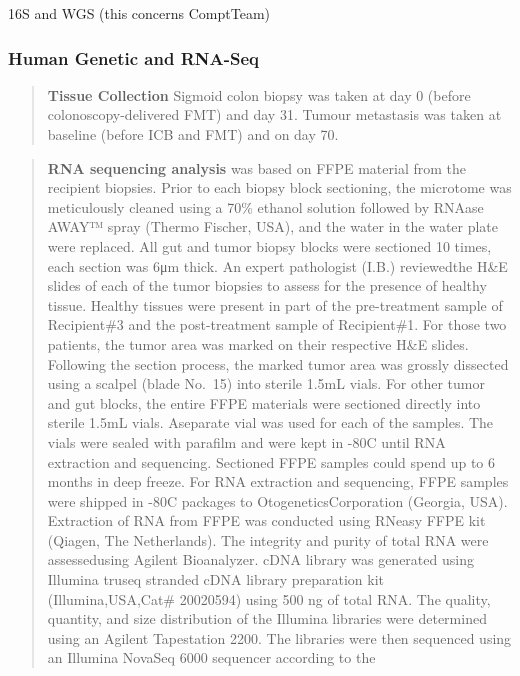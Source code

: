 \documentclass[
]{article}
\begin{document}
16S and WGS (this concerns ComptTeam)

\hypertarget{human-genetic-and-rna-seq}{%
\subsubsection{Human Genetic and
RNA-Seq}\label{human-genetic-and-rna-seq}}

\begin{quote}
\textbf{Tissue Collection} Sigmoid colon biopsy was taken at day 0
(before colonoscopy-delivered FMT) and day 31. Tumour metastasis was
taken at baseline (before ICB and FMT) and on day 70.
\end{quote}

\begin{quote}
\textbf{RNA sequencing analysis} was based on FFPE material from the
recipient biopsies. Prior to each biopsy block sectioning, the microtome
was meticulously cleaned using a 70\% ethanol solution followed by
RNAase AWAY™ spray (Thermo Fischer, USA), and the water in the water
plate were replaced. All gut and tumor biopsy blocks were sectioned 10
times, each section was 6μm thick. An expert pathologist (I.B.)
reviewedthe H\&E slides of each of the tumor biopsies to assess for the
presence of healthy tissue. Healthy tissues were present in part of the
pre-treatment sample of Recipient\#3 and the post-treatment sample of
Recipient\#1. For those two patients, the tumor area was marked on their
respective H\&E slides. Following the section process, the marked tumor
area was grossly dissected using a scalpel (blade No.~15) into sterile
1.5mL vials. For other tumor and gut blocks, the entire FFPE materials
were sectioned directly into sterile 1.5mL vials. Aseparate vial was
used for each of the samples. The vials were sealed with parafilm and
were kept in -80C until RNA extraction and sequencing. Sectioned FFPE
samples could spend up to 6 months in deep freeze. For RNA extraction
and sequencing, FFPE samples were shipped in -80C packages to
OtogeneticsCorporation (Georgia, USA). Extraction of RNA from FFPE was
conducted using RNeasy FFPE kit (Qiagen, The Netherlands). The integrity
and purity of total RNA were assessedusing Agilent Bioanalyzer. cDNA
library was generated using Illumina truseq stranded cDNA library
preparation kit (Illumina,USA,Cat\# 20020594) using 500 ng of total RNA.
The quality, quantity, and size distribution of the Illumina libraries
were determined using an Agilent Tapestation 2200. The libraries were
then sequenced using an Illumina NovaSeq 6000 sequencer according to the

\end{quote}
\end{document}
